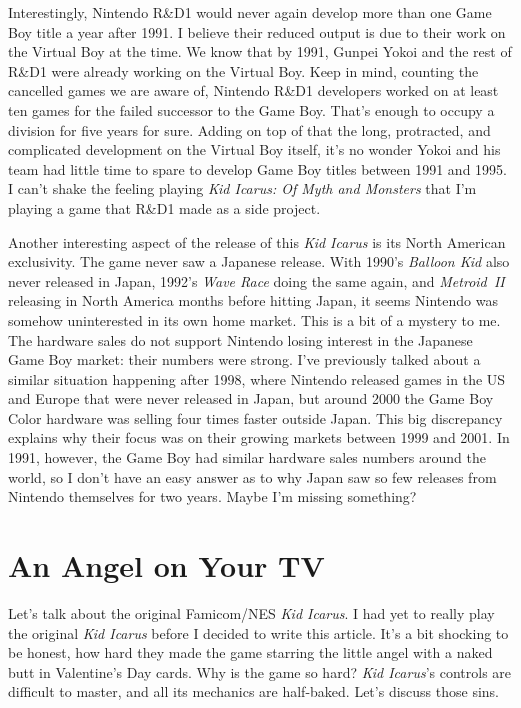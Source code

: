 \documentclass{book}
\begin{document}
Interestingly, Nintendo R\&D1 would never again develop more than one Game Boy title a year after 1991. I believe their reduced output is due to their work on the Virtual Boy at the time. We know that by 1991, Gunpei Yokoi and the rest of R\&D1 were already working on the Virtual Boy. Keep in mind, counting the cancelled games we are aware of, Nintendo R\&D1 developers worked on at least ten games for the failed successor to the Game Boy. That’s enough to occupy a division for five years for sure. Adding on top of that the long, protracted, and complicated development on the Virtual Boy itself, it’s no wonder Yokoi and his team had little time to spare to develop Game Boy titles between 1991 and 1995. I can’t shake the feeling playing \emph{Kid Icarus: Of Myth and Monsters} that I’m playing a game that R\&D1 made as a side project.

Another interesting aspect of the release of this \emph{Kid Icarus} is its North American exclusivity. The game never saw a Japanese release. With 1990’s \emph{Balloon Kid} also never released in Japan, 1992’s \emph{Wave Race} doing the same again, and \emph{Metroid II} releasing in North America months before hitting Japan, it seems Nintendo was somehow uninterested in its own home market. This is a bit of a mystery to me. The hardware sales do not support Nintendo losing interest in the Japanese Game Boy market: their numbers were strong. I’ve previously talked about a similar situation happening after 1998, where Nintendo released games in the US and Europe that were never released in Japan, but around 2000 the Game Boy Color hardware was selling four times faster outside Japan. This big discrepancy explains why their focus was on their growing markets between 1999 and 2001. In 1991, however, the Game Boy had similar hardware sales numbers around the world, so I don’t have an easy answer as to why Japan saw so few releases from Nintendo themselves for two years. Maybe I’m missing something?

\FloatBarrier\needspace{10mm}\section*{An Angel on Your TV}\nopagebreak[4]

Let’s talk about the original Famicom/NES \emph{Kid Icarus}. I had yet to really play the original \emph{Kid Icarus} before I decided to write this article. It’s a bit shocking to be honest, how hard they made the game starring the little angel with a naked butt in Valentine’s Day cards. Why is the game so hard? \emph{Kid Icarus}’s controls are difficult to master, and all its mechanics are half-baked. Let’s discuss those sins.
\end{document}
